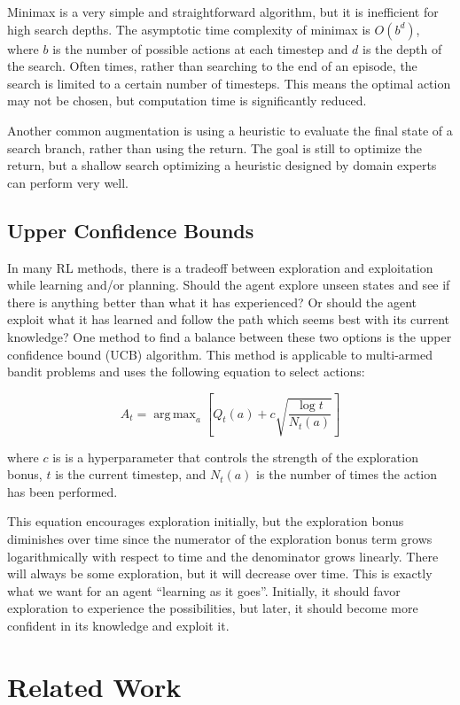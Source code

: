 \documentclass[letterpaper]{article} %
\DeclareMathOperator*{\argmax}{arg\,max}
\begin{document}
Minimax is a very simple and straightforward algorithm, but it is inefficient for high search depths. The asymptotic time complexity of minimax is \(O(b^{d})\), where \(b\) is the number of possible actions at each timestep and \(d\) is the depth
of the search. Often times, rather than searching to the end of an episode, the search is limited to a certain number of timesteps. This means the optimal action may not be chosen, but computation time is significantly reduced.

Another common augmentation is using a heuristic to evaluate the final state of a search branch, rather than using the return. The goal is still to optimize the return, but a shallow search optimizing a heuristic designed by domain experts can perform
very well.

\subsection{Upper Confidence Bounds}

In many RL methods, there is a tradeoff between exploration and exploitation while learning and/or planning. Should the agent explore unseen states and see if there is anything better than what it has experienced? Or should the agent exploit what it has
learned and follow the path which seems best with its current knowledge? One method to find a balance between these two options is the upper confidence bound (UCB) algorithm. This method is applicable to multi-armed bandit problems and uses the following
equation to select actions:

\[A_{t} = \argmax_{a}\left[Q_{t}(a) + c \sqrt{\frac{\log t}{N_{t}(a)}}\right]\]

\noindent{}
where \(c\) is is a hyperparameter that controls the strength of the exploration bonus, \(t\) is the current timestep, and \(N_{t}(a)\) is the number of times the action has been performed.

This equation encourages exploration initially, but the exploration bonus diminishes over time since the numerator of the exploration bonus term grows logarithmically with respect to time and the denominator grows linearly. There will always be some exploration, but it will
decrease over time. This is exactly what we want for an agent ``learning as it goes''. Initially, it should favor exploration to experience the possibilities, but later, it should become more confident in its knowledge and exploit it.

\section{Related Work}
\end{document}
